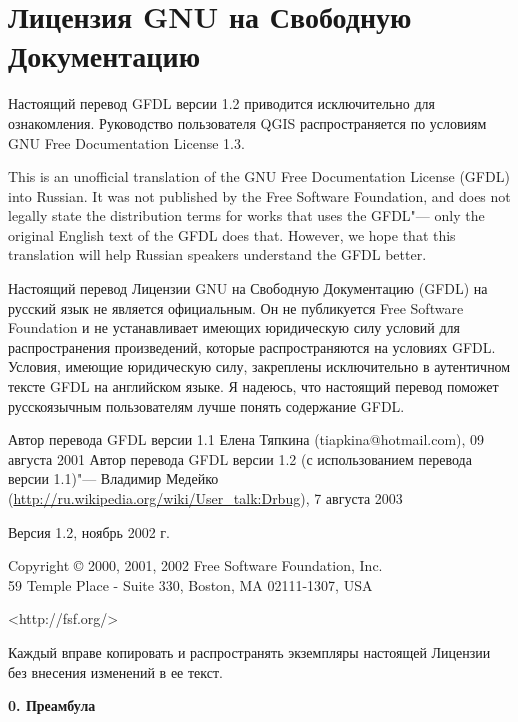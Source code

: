 \chapter{Лицензия GNU на Свободную Документацию}\label{label_fdl_ru}

Настоящий перевод GFDL версии 1.2 приводится исключительно для
ознакомления. Руководство пользователя QGIS распространяется по условиям
GNU Free Documentation License 1.3.

\bigskip

This is an unofficial translation of the GNU Free Documentation License
(GFDL) into Russian. It was not published by the Free Software
Foundation, and does not legally state the distribution terms for works
that uses the GFDL"--- only the original English text of the GFDL does
that. However, we hope that this translation will help Russian speakers
understand the GFDL better.

Настоящий перевод Лицензии GNU на Свободную Документацию (GFDL) на
русский язык не является официальным. Он не публикуется Free Software
Foundation и не устанавливает имеющих юридическую силу условий для
распространения произведений, которые распространяются на условиях GFDL.
Условия, имеющие юридическую силу, закреплены исключительно в аутентичном
тексте GFDL на английском языке. Я надеюсь, что настоящий перевод поможет
русскоязычным пользователям лучше понять содержание GFDL.

Автор перевода GFDL версии 1.1 Елена Тяпкина (tiapkina@hotmail.com),
09 августа 2001
Автор перевода GFDL версии 1.2 (с использованием перевода версии 1.1)"---
Владимир Медейко (\url{http://ru.wikipedia.org/wiki/User_talk:Drbug}),
7 августа 2003

 \begin{center}

       Версия 1.2, ноябрь 2002 г.


 Copyright \copyright{} 2000, 2001, 2002 Free Software Foundation, Inc.\\
 59 Temple Place - Suite 330, Boston, MA 02111-1307, USA

 \bigskip

     <http://fsf.org/>

 \bigskip

 Каждый вправе копировать и распространять экземпляры настоящей
 Лицензии без внесения изменений в ее текст.
\end{center}


\begin{center}
{\bf\large 0. Преамбула}
\end{center}

